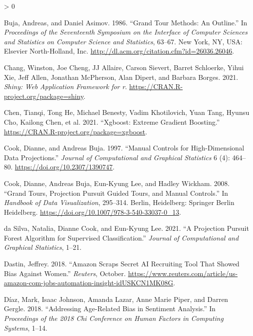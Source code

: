 \documentclass[
]{article}
\newlength{\cslhangindent}
\newenvironment{CSLReferences}[2] %
 {%
  \setlength{\parindent}{0pt}
  \ifodd #1 \everypar{\setlength{\hangindent}{\cslhangindent}}\ignorespaces\fi
  \ifnum #2 > 0
  \setlength{\parskip}{#2\baselineskip}
  \fi
 }%
 {}
\begin{document}
\begin{CSLReferences}{1}{0}
\leavevmode\hypertarget{ref-buja_grand_1986}{}%
Buja, Andreas, and Daniel Asimov. 1986. {``Grand {Tour} {Methods}: {An}
{Outline}.''} In \emph{Proceedings of the {Seventeenth} {Symposium} on
the {Interface} of {Computer} {Sciences} and {Statistics} on {Computer}
{Science} and {Statistics}}, 63--67. New York, NY, USA: Elsevier
North-Holland, Inc. \url{http://dl.acm.org/citation.cfm?id=26036.26046}.

\leavevmode\hypertarget{ref-chang_shiny_2021}{}%
Chang, Winston, Joe Cheng, JJ Allaire, Carson Sievert, Barret Schloerke,
Yihui Xie, Jeff Allen, Jonathan McPherson, Alan Dipert, and Barbara
Borges. 2021. \emph{Shiny: Web Application Framework for r}.
\url{https://CRAN.R-project.org/package=shiny}.

\leavevmode\hypertarget{ref-chen_xgboost_2021}{}%
Chen, Tianqi, Tong He, Michael Benesty, Vadim Khotilovich, Yuan Tang,
Hyunsu Cho, Kailong Chen, et al. 2021. {``Xgboost: {Extreme} {Gradient}
{Boosting}.''} \url{https://CRAN.R-project.org/package=xgboost}.

\leavevmode\hypertarget{ref-cook_manual_1997}{}%
Cook, Dianne, and Andreas Buja. 1997. {``Manual {Controls} for
{High}-{Dimensional} {Data} {Projections}.''} \emph{Journal of
Computational and Graphical Statistics} 6 (4): 464--80.
\url{https://doi.org/10.2307/1390747}.

\leavevmode\hypertarget{ref-cook_grand_2008}{}%
Cook, Dianne, Andreas Buja, Eun-Kyung Lee, and Hadley Wickham. 2008.
{``Grand {Tours}, {Projection} {Pursuit} {Guided} {Tours}, and {Manual}
{Controls}.''} In \emph{Handbook of {Data} {Visualization}}, 295--314.
Berlin, Heidelberg: Springer Berlin Heidelberg.
\url{https://doi.org/10.1007/978-3-540-33037-0_13}.

\leavevmode\hypertarget{ref-da_silva_projection_2021}{}%
da Silva, Natalia, Dianne Cook, and Eun-Kyung Lee. 2021. {``A
{Projection} {Pursuit} {Forest} {Algorithm} for {Supervised}
{Classification}.''} \emph{Journal of Computational and Graphical
Statistics}, 1--21.

\leavevmode\hypertarget{ref-dastin_amazon_2018}{}%
Dastin, Jeffrey. 2018. {``Amazon Scraps Secret {AI} Recruiting Tool That
Showed Bias Against Women.''} \emph{Reuters}, October.
\url{https://www.reuters.com/article/us-amazon-com-jobs-automation-insight-idUSKCN1MK08G}.

\leavevmode\hypertarget{ref-diaz_addressing_2018}{}%
Díaz, Mark, Isaac Johnson, Amanda Lazar, Anne Marie Piper, and Darren
Gergle. 2018. {``Addressing Age-Related Bias in Sentiment Analysis.''}
In \emph{Proceedings of the 2018 Chi Conference on Human Factors in
Computing Systems}, 1--14.


\end{CSLReferences}
\end{document}
